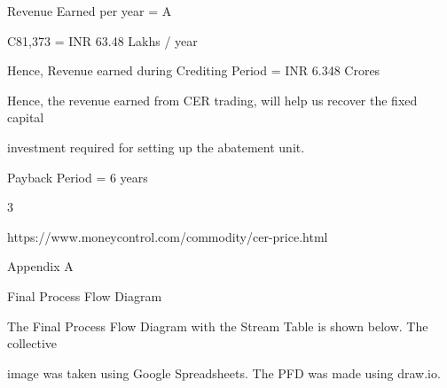 \documentclass[a4paper,portrait,12pt]{article}
\begin{document}
\begin{flushleft}
Revenue Earned per year = A
\end{flushleft}


\begin{flushleft}
C81,373 = INR 63.48 Lakhs / year
\end{flushleft}


\begin{flushleft}
Hence, Revenue earned during Crediting Period = INR 6.348 Crores
\end{flushleft}


\begin{flushleft}
Hence, the revenue earned from CER trading, will help us recover the fixed capital
\end{flushleft}


\begin{flushleft}
investment required for setting up the abatement unit.
\end{flushleft}


\begin{flushleft}
Payback Period = 6 years
\end{flushleft}





3





\begin{flushleft}
https://www.moneycontrol.com/commodity/cer-price.html
\end{flushleft}





\begin{flushleft}
\newpage
Appendix A
\end{flushleft}





\begin{flushleft}
Final Process Flow Diagram
\end{flushleft}


\begin{flushleft}
The Final Process Flow Diagram with the Stream Table is shown below. The collective
\end{flushleft}


\begin{flushleft}
image was taken using Google Spreadsheets. The PFD was made using draw.io.
\end{flushleft}
\end{document}
